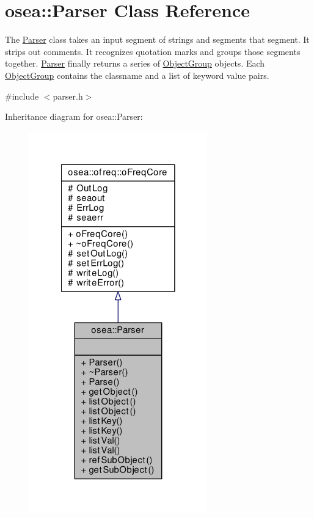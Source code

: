 \hypertarget{classosea_1_1_parser}{\section{osea\-:\-:Parser Class Reference}
\label{classosea_1_1_parser}
}


The \hyperlink{classosea_1_1_parser}{Parser} class takes an input segment of strings and segments that segment. It strips out comments. It recognizes quotation marks and groups those segments together. \hyperlink{classosea_1_1_parser}{Parser} finally returns a series of \hyperlink{classosea_1_1_object_group}{Object\-Group} objects. Each \hyperlink{classosea_1_1_object_group}{Object\-Group} contains the classname and a list of keyword value pairs.  




{\ttfamily \#include $<$parser.\-h$>$}



Inheritance diagram for osea\-:\-:Parser\-:\nopagebreak
\begin{figure}[H]
\begin{center}
\leavevmode
\includegraphics[width=218pt]{classosea_1_1_parser__inherit__graph}
\end{center}
\end{figure}
